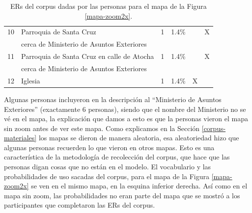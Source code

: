 \begin{table}[H]
{\begin{center}
\begin{tabular}{|l|l|c|c|c|c|}
10&Parroquia de Santa Cruz  				   &    1 &	1.4\%	&&X\\  
&cerca de Ministerio de Asuntos Exteriores		   &	  &		&&\\  \hline
11&Parroquia de Santa Cruz en calle de Atocha  		   &	1 &	1.4\%	&&X\\  
&cerca de Ministerio de Asuntos Exteriores		   &	  &		&&\\  \hline
12&Iglesia						   &    1 &	1.4\%	&X&\\  \hline
\end{tabular}
\caption{ERs del corpus dadas por las personas para el mapa de la Figura \ref{mapa-zoom2x}.}\label{freq-mapa-zoom2x}
\end{center}
}
\end{table}


Algunas personas incluyeron en la descripci\'on al ``Ministerio de Asuntos Exteriores'' (exactamente 6 personas), siendo que el nombre del Ministerio no se v\'e en el mapa, la explicaci\'on que damos a esto es que la personas vieron el mapa sin zoom antes de ver este mapa. Como explicamos en la Secci\'on \ref{corpus-materiales} los mapas se dieron de manera aleatoria, esa aleatoriedad hizo que algunas personas recuerden lo que vieron en otros mapas. Esto es una caracter\'istica de la metodolog\'ia de recolecci\'on del corpus, que hace que las personas digan cosas que no est\'an en el modelo. 
El vocabulario y las probabilidades de uso sacadas del corpus, para el mapa de la Figura \ref{mapa-zoom2x} se ven en el mismo mapa, en la esquina inferior derecha. As\'i como en el mapa sin zoom, las probabilidades no eran parte del mapa que se mostr\'o a los participantes que completaron las ERs del corpus.

